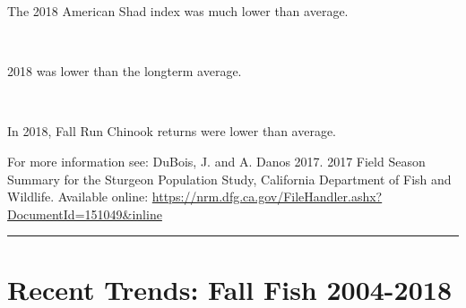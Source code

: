 \documentclass[
]{book}
\begin{document}
\begin{panel-grid}
\begin{columns-nocenter}
\begin{column800}
\begin{expand}
\end{expand}

\end{column800}

\end{columns-nocenter}

\begin{columns-nocenter}

\begin{column800}

The 2018 American Shad index was much lower than average.

\end{column800}

\begin{column40}

~

\end{column40}

\begin{column800}

2018 was lower than the longterm average.

\end{column800}

\begin{column40}

~

\end{column40}

\begin{column800}

In 2018, Fall Run Chinook returns were lower than average.

\end{column800}

\end{columns-nocenter}

\end{panel-grid}

\begin{disclaimer}
For more information see: DuBois, J. and A. Danos 2017. 2017 Field
Season Summary for the Sturgeon Population Study, California Department
of Fish and Wildlife. Available online:
\url{https://nrm.dfg.ca.gov/FileHandler.ashx?DocumentId=151049\&inline}
\end{disclaimer}

\begin{center}\rule{0.5\linewidth}{0.5pt}\end{center}

\hypertarget{recent-trends-fall-fish-2004-2018}{%
\section{Recent Trends: Fall Fish 2004-2018}\label{recent-trends-fall-fish-2004-2018}}
\end{document}

